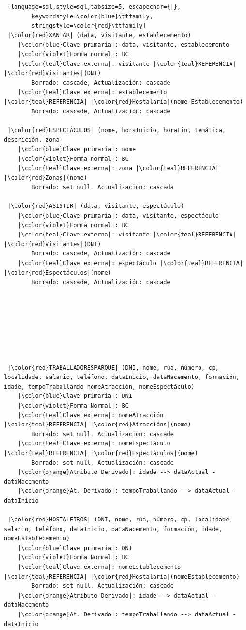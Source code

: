 \documentclass[12pt,a4paper]{book}
\theoremstyle{definition}
\theoremstyle{break}
\begin{document}
\begin{lstlisting} [language=sql,style=sql,tabsize=5, escapechar={|},
		keywordstyle=\color{blue}\ttfamily,
		stringstyle=\color{red}\ttfamily]
 |\color{red}XANTAR| (data, visitante, establecemento)
	|\color{blue}Clave primaria|: data, visitante, establecemento
	|\color{violet}Forma normal|: BC
	|\color{teal}Clave externa|: visitante |\color{teal}REFERENCIA| |\color{red}Visitantes|(DNI)
		Borrado: cascade, Actualización: cascade
	|\color{teal}Clave externa|: establecemento |\color{teal}REFERENCIA| |\color{red}Hostalaría|(nome Establecemento)
		Borrado: cascade, Actualización: cascade
		
 |\color{red}ESPECTÁCULOS| (nome, horaInicio, horaFin, temática, descrición, zona)
	|\color{blue}Clave primaria|: nome
	|\color{violet}Forma normal|: BC
	|\color{teal}Clave externa|: zona |\color{teal}REFERENCIA| |\color{red}Zonas|(nome)
		Borrado: set null, Actualización: cascada
		
 |\color{red}ASISTIR| (data, visitante, espectáculo)
	|\color{blue}Clave primaria|: data, visitante, espectáculo
	|\color{violet}Forma normal|: BC
	|\color{teal}Clave externa|: visitante |\color{teal}REFERENCIA| |\color{red}Visitantes|(DNI)
		Borrado: cascade, Actualización: cascade
	|\color{teal}Clave externa|: espectáculo |\color{teal}REFERENCIA| |\color{red}Espectáculos|(nome)
		Borrado: cascade, Actualización: cascade
		
		
		
		
		
		
		
		
 |\color{red}TRABALLADORESPARQUE| (DNI, nome, rúa, número, cp, localidade, salario, teléfono, dataInicio, dataNacemento, formación, idade, tempoTraballando nomeAtracción, nomeEspectáculo)
	|\color{blue}Clave primaria|: DNI
	|\color{violet}Forma Normal|: BC
	|\color{teal}Clave externa|: nomeAtracción |\color{teal}REFERENCIA| |\color{red}Atraccións|(nome)
		Borrado: set null, Actualización: cascade
	|\color{teal}Clave externa|: nomeEspectáculo |\color{teal}REFERENCIA| |\color{red}Espectáculos|(nome)
		Borrado: set null, Actualización: cascade
	|\color{orange}Atributo Derivado|: idade --> dataActual - dataNacemento
	|\color{orange}At. Derivado|: tempoTraballando --> dataActual - dataInicio
		
 |\color{red}HOSTALEIROS| (DNI, nome, rúa, número, cp, localidade, salario, teléfono, dataInicio, dataNacemento, formación, idade, nomeEstablecemento)
	|\color{blue}Clave primaria|: DNI
	|\color{violet}Forma Normal|: BC
	|\color{teal}Clave externa|: nomeEstablecemento |\color{teal}REFERENCIA| |\color{red}Hostalaría|(nomeEstablecemento)
		Borrado: set null, Actualización: cascade
	|\color{orange}Atributo Derivado|: idade --> dataActual - dataNacemento
	|\color{orange}At. Derivado|: tempoTraballando --> dataActual - dataInicio
		

\end{lstlisting}
\end{document}
